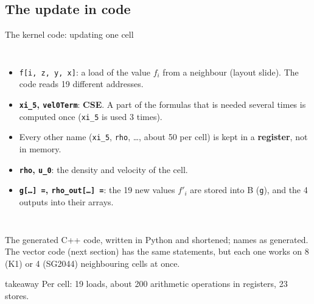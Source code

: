 \documentclass[aspectratio=169,10pt,t]{beamer}
\newcommand{\term}[1]{\textcolor{psblue!85!black}{\textbf{#1}}} %
\newcommand{\code}[1]{\texttt{#1}}
\newcommand{\takeaway}[1]{\par\vfill
  \begin{beamercolorbox}[wd=\textwidth,sep=4pt,rounded=true]{takeaway}
    \small #1
  \end{beamercolorbox}}
\begin{document}
\subsection{The update in code}
\begin{frame}{The kernel code: updating one cell}
  \begin{columns}[T,onlytextwidth]
    \vspace{1mm}
    
    \vspace{1mm}
    \scriptsize
    \begin{itemize}\setlength{\itemsep}{2pt}
      \item \textcolor{psorange!85!black}{\code{f[i, z, y, x]}}: a load of the value $f_i$ from a neighbour (layout
            slide). The code reads 19 different addresses.
      \item \textcolor{psviolet}{\textbf{\code{xi\_5}, \code{vel0Term}}}: \term{CSE}. A part of the formulas that is
            needed several times is computed once (\code{xi\_5} is used 3 times).
      \item Every other name (\code{xi\_5}, \code{rho}, \ldots, about 50 per cell) is kept in a \term{register}, not
            in memory.
      \item \textcolor{psteal!65!black}{\textbf{\code{rho}, \code{u\_0}}}: the density and velocity of the cell.
      \item \textcolor{psblue!85!black}{\textbf{\code{g[\ldots] =}, \code{rho\_out[\ldots] =}}}: the 19 new values
            $f'_i$ are stored into B (\code{g}), and the 4 outputs into their arrays.
    \end{itemize}
  \end{columns}
  \vspace{1mm}
  {\scriptsize\color{psgray}The generated C++ code, written in Python and shortened; names as generated. The vector
  code (next section) has the same statements, but each one works on 8 (K1) or 4 (SG2044) neighbouring cells at
  once.\par}
  \takeaway{Per cell: 19 loads, about 200 arithmetic operations in registers, 23 stores.}
\end{frame}
\end{document}
